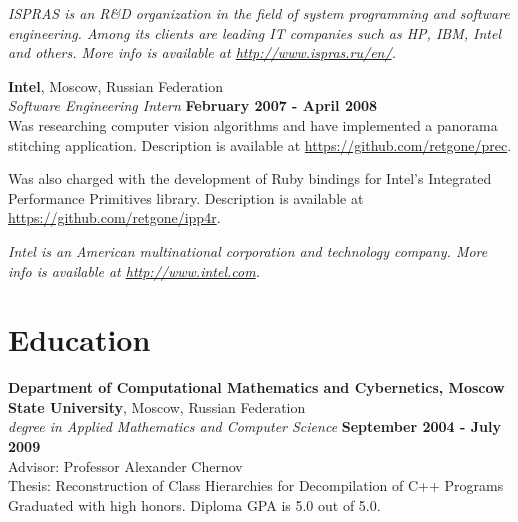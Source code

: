 \documentclass[margin,line]{CV}
\begin{document}
\begin{resume}
\ifdefined\superofficial
    {\footnotesize\textit{ISPRAS is an R\&D organization in the field of system programming and software engineering. Among its clients are leading IT companies such as HP, IBM, Intel and others. More info is available at \url{http://www.ispras.ru/en/}.}}
\fi
    
   
    \textbf{Intel}, Moscow, Russian Federation \vspace{2mm}\\\vspace{1mm}%
    \textsl{Software Engineering Intern} \hfill \textbf{February 2007 - April 2008}\\
    Was researching computer vision algorithms and have implemented a panorama stitching application. Description is available at \url{https://github.com/retgone/prec}.

    Was also charged with the development of Ruby bindings for Intel's Integrated Performance Primitives library. Description is available at \url{https://github.com/retgone/ipp4r}.
    
\ifdefined\superofficial
    {\footnotesize\textit{Intel is an American multinational corporation and technology company. More info is available at \url{http://www.intel.com}.}}
\fi
    
    
   
   
    \pagebreak    

   
    \section{\mysidestyle Education}
    \textbf{Department of Computational Mathematics and Cybernetics, Moscow State University}, Moscow, Russian Federation \vspace{2mm}\\\vspace{1mm}%
    \textsl{ degree in Applied Mathematics and Computer Science} \hfill \textbf{September 2004 - July 2009}\vspace{1mm}\\
    Advisor: Professor Alexander Chernov \\
    Thesis: Reconstruction of Class Hierarchies for Decompilation of C++ Programs \\
    Graduated with high honors. Diploma GPA is 5.0 out of 5.0.


\end{resume}
\end{document}
